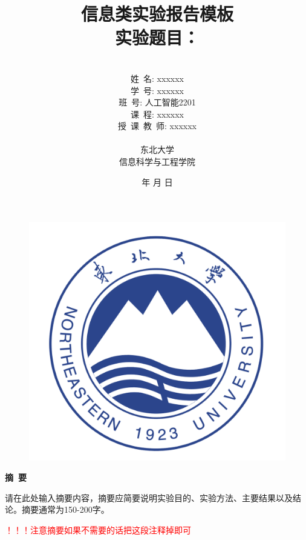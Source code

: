 \documentclass[a4paper]{article}
\begin{document}
\renewcommand{\contentsname}{目\ 录}
\renewcommand{\appendixname}{附录}
\newcommand{\appendixpagename}{附录}
\renewcommand{\refname}{参考文献} 
\renewcommand{\figurename}{图}
\renewcommand{\tablename}{表}
\renewcommand{\today}{\number\year 年 \number\month 月 \number\day 日}

\begin{figure}
    \centering
    \includegraphics[width=0.5\linewidth]{images/logo.png}
\end{figure}


\title{{\Huge 信息类实验报告模板{\large\linebreak\\}}{\Large 实验题目：\linebreak\linebreak}}
\author{\\
姓\ 名: xxxxxx\\
学\ 号: xxxxxx\\
班\ 号: 人工智能2201\\
课\ 程: xxxxxx\\
授\ 课\ 教\ 师: xxxxxx\\\\
东北大学\\
信息科学与工程学院\\
}
\date{\today}
\maketitle
\newpage

\begin{center}
{\Large\bf{摘\ 要\\}}
\end{center}
请在此处输入摘要内容，摘要应简要说明实验目的、实验方法、主要结果以及结论。摘要通常为150-200字。


\textcolor{red}{！！！注意摘要如果不需要的话把这段注释掉即可}
\end{document}
